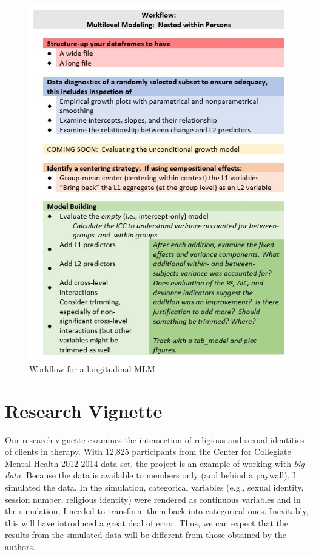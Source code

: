 \documentclass[
  english,
]{book}
\begin{document}
\begin{figure}
\centering
\includegraphics{images/LongExpl/WrkFlowLong.jpg}
\caption{Workflow for a longitudinal MLM}
\end{figure}

\hypertarget{research-vignette-1}{%
\section{Research Vignette}\label{research-vignette-1}}

Our research vignette \citep{lefevor_religious_2017} examines the intersection of religious and sexual identities of clients in therapy. With 12,825 participants from the Center for Collegiate Mental Health 2012-2014 data set, the project is an example of working with \emph{big data.} Because the data is available to members only (and behind a paywall), I simulated the data. In the simulation, categorical variables (e.g., sexual identity, session number, religious identity) were rendered as continuous variables and in the simulation, I needed to transform them back into categorical ones. Inevitably, this will have introduced a great deal of error. Thus, we can expect that the results from the simulated data will be different from those obtained by the authors.
\end{document}

